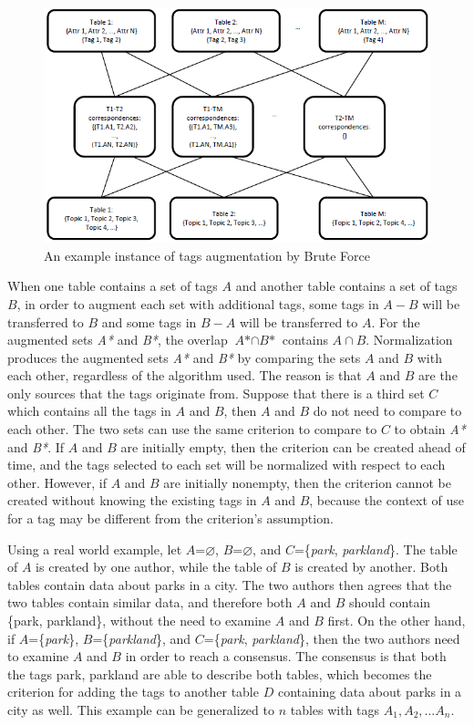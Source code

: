 \begin{figure}
    \centering
    \includegraphics[width=5in]{figures/an-example-instance-brute-force.png}
    \caption{An example instance of tags augmentation by Brute Force}
    \label{fig:an-example-instance-brute-force}
\end{figure}

When one table contains a set of tags $A$ and another table contains a set of tags $B$, in order to augment each set with additional tags, some tags in $A-B$ will be transferred to $B$ and some tags in $B-A$ will be transferred to $A$. For the augmented sets \textit{A*} and \textit{B*}, the overlap $\textit{A*}\cap\textit{B*}$ contains $A\cap B$. Normalization produces the augmented sets \textit{A*} and \textit{B*} by comparing the sets $A$ and $B$ with each other, regardless of the algorithm used. The reason is that $A$ and $B$ are the only sources that the tags originate from. Suppose that there is a third set $C$ which contains all the tags in $A$ and $B$, then $A$ and $B$ do not need to compare to each other. The two sets can use the same criterion to compare to $C$ to obtain \textit{A*} and \textit{B*}. If $A$ and $B$ are initially empty, then the criterion can be created ahead of time, and the tags selected to each set will be normalized with respect to each other. However, if $A$ and $B$ are initially nonempty, then the criterion cannot be created without knowing the existing tags in $A$ and $B$, because the context of use for a tag may be different from the criterion\textquoteright s assumption.

Using a real world example, let $A$=\ensuremath{\varnothing}, $B$=\ensuremath{\varnothing}, and $C$=\{\textit{park}, \textit{parkland}\}. The table of $A$ is created by one author, while the table of $B$ is created by another. Both tables contain data about parks in a city. The two authors then agrees that the two tables contain similar data, and therefore both $A$ and $B$ should contain \{park, parkland\}, without the need to examine $A$ and $B$ first. On the other hand, if $A$=\{\textit{park}\}, $B$=\{\textit{parkland}\}, and $C$=\{\textit{park}, \textit{parkland}\}, then the two authors need to examine $A$ and $B$ in order to reach a consensus. The consensus is that both the tags park, parkland are able to describe both tables, which becomes the criterion for adding the tags to another table $D$ containing data about parks in a city as well. This example can be generalized to $n$ tables with tags $A_1, A_2, \dots A_n$. 

